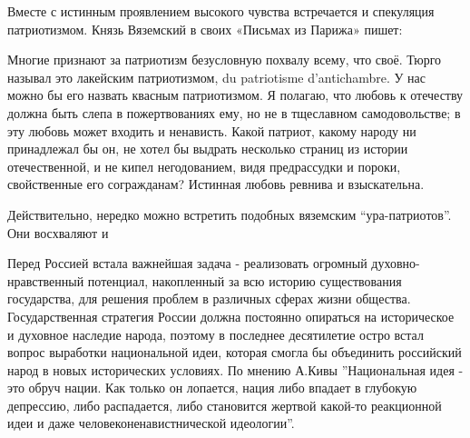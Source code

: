 \documentclass[a4paper,14pt]{extreport}
\begin{document}
Вместе с истинным проявлением высокого чувства встречается и спекуляция патриотизмом. Князь Вяземский в своих «Письмах из Парижа» пишет:

	Многие признают за патриотизм безусловную похвалу всему, что своё. Тюрго называл это лакейским патриотизмом, du patriotisme d'antichambre. У нас можно бы его назвать квасным патриотизмом. Я полагаю, что любовь к отечеству должна быть слепа в пожертвованиях ему, но не в тщеславном самодовольстве; в эту любовь может входить и ненависть. Какой патриот, какому народу ни принадлежал бы он, не хотел бы выдрать несколько страниц из истории отечественной, и не кипел негодованием, видя предрассудки и пороки, свойственные его согражданам? Истинная любовь ревнива и взыскательна.

Действительно, нередко можно встретить подобных вяземским ``ура-патриотов''. Они восхваляют и 

Перед Россией встала важнейшая задача - реализовать огромный духовно-нравственный потенциал, накопленный за всю историю существования государства, для решения проблем в различных сферах жизни общества. Государственная стратегия России должна постоянно опираться на историческое и духовное наследие народа, поэтому в последнее десятилетие остро встал вопрос выработки национальной идеи, которая смогла бы объединить российский народ в новых исторических условиях. По мнению А.Кивы ''Национальная идея - это обруч нации. Как только он лопается, нация либо впадает в глубокую депрессию, либо распадается, либо становится жертвой какой-то реакционной идеи и даже человеконенавистнической идеологии''.
\end{document}
